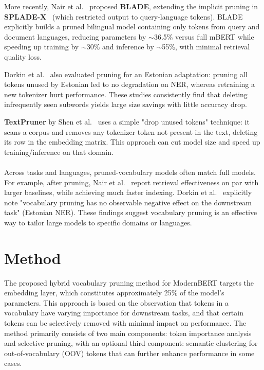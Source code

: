 \documentclass[twocolumn]{article}
\begin{document}
More recently, Nair et al.~\cite{nair2023blade} proposed \textbf{BLADE}, extending the implicit pruning in \textbf{SPLADE-X}~\cite{formal2023spladex} (which restricted output to query-language tokens). BLADE explicitly builds a pruned bilingual model containing only tokens from query and document languages, reducing parameters by $\sim$36.5\% versus full mBERT while speeding up training by $\sim$30\% and inference by $\sim$55\%, with minimal retrieval quality loss.

Dorkin et al.~\cite{dorkin2025estonian} also evaluated pruning for an Estonian adaptation: pruning all tokens unused by Estonian led to no degradation on NER, whereas retraining a new tokenizer hurt performance. These studies consistently find that deleting infrequently seen subwords yields large size savings with little accuracy drop.

\textbf{TextPruner} by Shen et al.~\cite{shen2022textpruner} uses a simple "drop unused tokens" technique: it scans a corpus and removes any tokenizer token not present in the text, deleting its row in the embedding matrix. This approach can cut model size and speed up training/inference on that domain.
\\ \\
Across tasks and languages, pruned-vocabulary models often match full models. For example, after pruning, Nair et al.~\cite{nair2023blade} report retrieval effectiveness on par with larger baselines, while achieving much faster indexing. Dorkin et al.~\cite{dorkin2025estonian} explicitly note "vocabulary pruning has no observable negative effect on the downstream task" (Estonian NER). These findings suggest vocabulary pruning is an effective way to tailor large models to specific domains or languages.

\section{Method}
The proposed hybrid vocabulary pruning method for ModernBERT targets the embedding layer, which constitutes approximately 25\% of the model's parameters. This approach is based on the observation that tokens in a vocabulary have varying importance for downstream tasks, and that certain tokens can be selectively removed with minimal impact on performance. The method primarily consists of two main components: token importance analysis and selective pruning, with an optional third component: semantic clustering for out-of-vocabulary (OOV) tokens that can further enhance performance in some cases.
\end{document}
